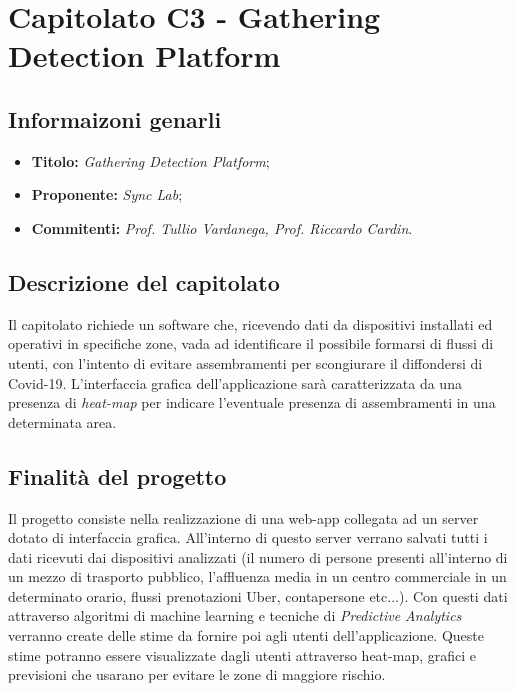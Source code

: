 \section{Capitolato C3 - Gathering Detection Platform}
\subsection{Informaizoni genarli}
\begin{itemize}
    \item \textbf{Titolo:} \textit{Gathering Detection Platform};
    \item \textbf{Proponente:} \textit{Sync Lab};
    \item \textbf{Commitenti:} \textit{Prof. Tullio Vardanega, Prof. Riccardo Cardin}.
\end{itemize}
\subsection{Descrizione del capitolato}
Il capitolato richiede un software che, ricevendo dati da dispositivi installati ed operativi in specifiche zone, 
vada ad identificare il possibile formarsi di flussi di utenti, con l'intento di evitare assembramenti per scongiurare il diffondersi di Covid-19.
L'interfaccia grafica dell'applicazione sarà caratterizzata da una presenza di \textit{heat-map} per indicare l'eventuale presenza di assembramenti in una determinata area.
\subsection{Finalità del progetto}
Il progetto consiste nella realizzazione di una web-app collegata ad un server dotato di interfaccia grafica. All'interno di questo server verrano salvati tutti i dati ricevuti dai dispositivi analizzati 
(il numero di persone presenti all'interno di un mezzo di trasporto pubblico, l'affluenza media in un centro commerciale in un determinato orario, flussi prenotazioni Uber, contapersone etc...). 
Con questi dati attraverso algoritmi di machine learning e tecniche di \textit{Predictive Analytics} verranno create delle stime da fornire poi agli utenti dell'applicazione. 
Queste stime potranno essere visualizzate dagli utenti attraverso heat-map, grafici e previsioni che usarano per evitare le zone di maggiore rischio.
